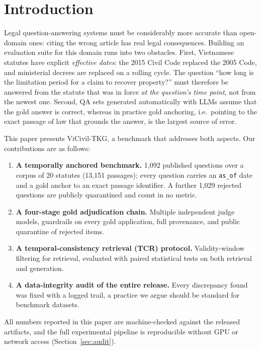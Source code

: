 \documentclass[10pt,a4paper,twocolumn]{article}
\newcommand{\code}[1]{\texttt{#1}}
\begin{document}
\section{Introduction}

Legal question-answering systems must be considerably more accurate than open-domain ones: citing the wrong article has real legal consequences. Building an evaluation suite for this domain runs into two obstacles. First, Vietnamese statutes have explicit \emph{effective dates}: the 2015 Civil Code replaced the 2005 Code, and ministerial decrees are replaced on a rolling cycle. The question ``how long is the limitation period for a claim to recover property?'' must therefore be answered from the statute that was in force \emph{at the question's time point}, not from the newest one. Second, QA sets generated automatically with LLMs assume that the gold answer is correct, whereas in practice gold anchoring, i.e.\ pointing to the exact passage of law that grounds the answer, is the largest source of error.

This paper presents ViCivil-TKG, a benchmark that addresses both aspects. Our contributions are as follows:

\begin{enumerate}
\item \textbf{A temporally anchored benchmark.} 1,092 published questions over a corpus of 20 statutes (13{,}151 passages); every question carries an \code{as\_of} date and a gold anchor to an exact passage identifier. A further 1,029 rejected questions are publicly quarantined and count in no metric.
\item \textbf{A four-stage gold adjudication chain.} Multiple independent judge models, guardrails on every gold application, full provenance, and public quarantine of rejected items.
\item \textbf{A temporal-consistency retrieval (TCR) protocol.} Validity-window filtering for retrieval, evaluated with paired statistical tests on both retrieval and generation.
\item \textbf{A data-integrity audit of the entire release.} Every discrepancy found was fixed with a logged trail, a practice we argue should be standard for benchmark datasets.
\end{enumerate}

All numbers reported in this paper are machine-checked against the released artifacts, and the full experimental pipeline is reproducible without GPU or network access (Section~\ref{sec:audit}).
\end{document}
